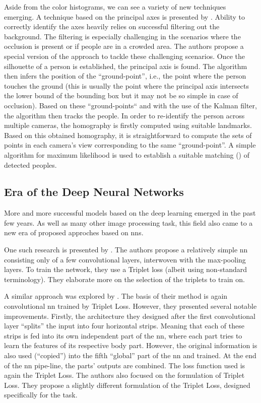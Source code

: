 Aside from the color histograms, we can see a variety of new techniques emerging. A technique based on the principal axes is presented by \cite{hu2006principal}. Ability to correctly identify the axes heavily relies on successful filtering out the background. The filtering is especially challenging in the scenarios where the occlusion is present or if people are in a crowded area. The authors propose a special version of the approach to tackle these challenging scenarios. Once the silhouette of a person is established, the principal axis is found. The algorithm then infers the position of the ``ground-point'', i.e., the point where the person touches the ground (this is usually the point where the principal axis intersects the lower bound of the bounding box but it may not be so simple in case of occlusion). Based on these ``ground-points`` and with the use of the Kalman filter, the algorithm then tracks the people. In order to re-identify the person across multiple cameras, the homography is firstly computed using suitable landmarks. Based on this obtained homography, it is straightforward to compute the sets of points in each camera's view corresponding to the same ``ground-point''. A simple algorithm for maximum likelihood is used to establish a suitable matching (\reid{}) of detected peoples.

\subsection{Era of the Deep Neural Networks}

More and more successful models based on the deep learning emerged in the past few years. As well as many other image processing task, this field also came to a new era of proposed approches based on \glspl{nn}.

One such research is presented by \cite{ding2015deep}. The authors propose a relatively simple \gls{nn} consisting only of a few convolutional layers, interwoven with the max-pooling layers. To train the network, they use a Triplet loss (albeit using non-standard terminology). They elaborate more on the selection of the triplets to train on.

A similar approach was explored by \cite{cheng2016person}. The basis of their method is again convolutional \gls{nn} trained by Triplet Loss. However, they presented several notable improvements. Firstly, the architecture they designed after the first convolutional layer ``splits'' the input into four horizontal strips. Meaning that each of these strips is fed into its own independent part of the \gls{nn}, where each part tries to learn the features of its respective body part. However, the original information is also used (``copied'') into the fifth ``global'' part of the \gls{nn} and trained. At the end of the \gls{nn} pipe-line, the parts' outputs are combined. The loss function used is again the Triplet Loss. The authors also focused on the formulation of Triplet Loss. They propose a slightly different formulation of the Triplet Loss, designed specifically for the \reid{} task.

